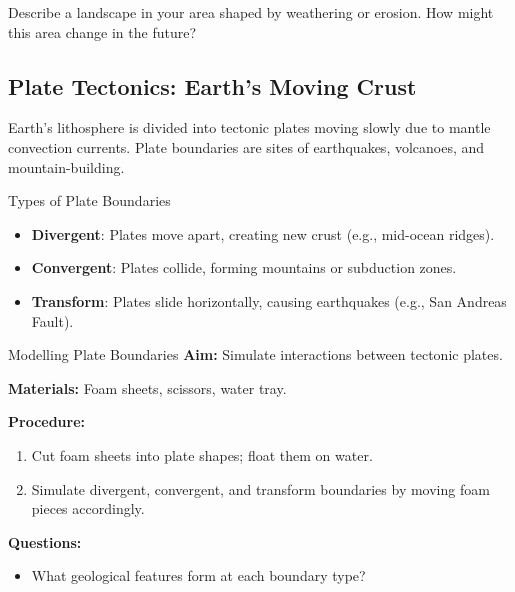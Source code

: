 \begin{stopandthink}
Describe a landscape in your area shaped by weathering or erosion. How might this area change in the future?
\end{stopandthink}

\subsection{Plate Tectonics: Earth's Moving Crust}

Earth's lithosphere is divided into tectonic plates moving slowly due to mantle convection currents. Plate boundaries are sites of earthquakes, volcanoes, and mountain-building.


\begin{keyconcept}{Types of Plate Boundaries}
\begin{itemize}
    \item \textbf{Divergent}: Plates move apart, creating new crust (e.g., mid-ocean ridges).
    \item \textbf{Convergent}: Plates collide, forming mountains or subduction zones.
    \item \textbf{Transform}: Plates slide horizontally, causing earthquakes (e.g., San Andreas Fault).
\end{itemize}
\end{keyconcept}

\begin{investigation}{Modelling Plate Boundaries}
\textbf{Aim:} Simulate interactions between tectonic plates.

\textbf{Materials:} Foam sheets, scissors, water tray.

\textbf{Procedure:}
\begin{enumerate}
    \item Cut foam sheets into plate shapes; float them on water.
    \item Simulate divergent, convergent, and transform boundaries by moving foam pieces accordingly.
\end{enumerate}

\textbf{Questions:}
\begin{itemize}
    \item What geological features form at each boundary type?
\end{itemize}
\end{investigation}

